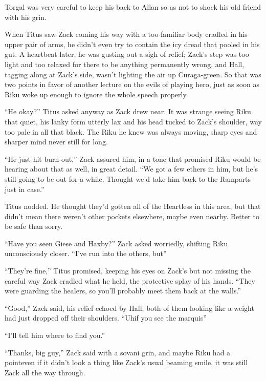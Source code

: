 Torgal was very careful to keep his back to Allan so as not to shock his old friend with his grin.


\scenechange


When Titus saw Zack coming his way with a too-familiar body cradled in his upper pair of arms, he didn't even try to contain the icy dread that pooled in his gut. A heartbeat later, he was gusting out a sigh of relief; Zack's step was too light and too relaxed for there to be anything permanently wrong, and Hall, tagging along at Zack's side, wasn't lighting the air up Curaga-green. So that was two points in favor of another lecture on the evils of playing hero, just as soon as Riku woke up enough to ignore the whole speech properly.

``He okay?'' Titus asked anyway as Zack drew near. It was strange seeing Riku that quiet, his lanky form utterly lax and his head tucked to Zack's shoulder, way too pale in all that black. The Riku he knew was always moving, sharp eyes and sharper mind never still for long.

``He just hit burn-out,'' Zack assured him, in a tone that promised Riku would be hearing about that as well, in great detail. ``We got a few ethers in him, but he's still going to be out for a while. Thought we'd take him back to the Ramparts just in case.''

Titus nodded. He thought they'd gotten all of the Heartless in this area, but that didn't mean there weren't other pockets elsewhere, maybe even nearby. Better to be safe than sorry.

``Have you seen Giese and Haxby?'' Zack asked worriedly, shifting Riku unconsciously closer. ``I've run into the others, but\textemdash''

``They're fine,'' Titus promised, keeping his eyes on Zack's but not missing the careful way Zack cradled what he held, the protective splay of his hands. ``They were guarding the healers, so you'll probably meet them back at the walls.''

``Good,'' Zack said, his relief echoed by Hall, both of them looking like a weight had just dropped off their shoulders. ``Uh\textemdash if you see the marquis\textemdash''

``I'll tell him where to find you.''

``Thanks, big guy,'' Zack said with a sovani grin, and maybe Riku had a point\textemdash even if it didn't look a thing like Zack's usual beaming smile, it was still Zack all the way through.

